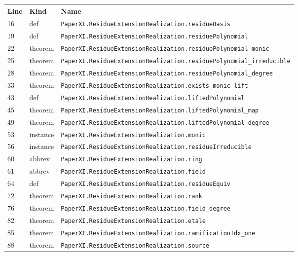 \documentclass[10pt,oneside]{book}
\begin{document}
\begin{longtable}{@{}p{}p{}p{}@{}}\toprule Line&Kind&Name\\\midrule\endhead

16&def&\nolinkurl{PaperXI.ResidueExtensionRealization.residueBasis}\\

19&def&\nolinkurl{PaperXI.ResidueExtensionRealization.residuePolynomial}\\

22&theorem&\nolinkurl{PaperXI.ResidueExtensionRealization.residuePolynomial_monic}\\

25&theorem&\nolinkurl{PaperXI.ResidueExtensionRealization.residuePolynomial_irreducible}\\

28&theorem&\nolinkurl{PaperXI.ResidueExtensionRealization.residuePolynomial_degree}\\

33&theorem&\nolinkurl{PaperXI.ResidueExtensionRealization.exists_monic_lift}\\

43&def&\nolinkurl{PaperXI.ResidueExtensionRealization.liftedPolynomial}\\

45&theorem&\nolinkurl{PaperXI.ResidueExtensionRealization.liftedPolynomial_map}\\

49&theorem&\nolinkurl{PaperXI.ResidueExtensionRealization.liftedPolynomial_degree}\\

53&instance&\nolinkurl{PaperXI.ResidueExtensionRealization.monic}\\

56&instance&\nolinkurl{PaperXI.ResidueExtensionRealization.residueIrreducible}\\

60&abbrev&\nolinkurl{PaperXI.ResidueExtensionRealization.ring}\\

61&abbrev&\nolinkurl{PaperXI.ResidueExtensionRealization.field}\\

64&def&\nolinkurl{PaperXI.ResidueExtensionRealization.residueEquiv}\\

72&theorem&\nolinkurl{PaperXI.ResidueExtensionRealization.rank}\\

76&theorem&\nolinkurl{PaperXI.ResidueExtensionRealization.field_degree}\\

82&theorem&\nolinkurl{PaperXI.ResidueExtensionRealization.etale}\\

85&theorem&\nolinkurl{PaperXI.ResidueExtensionRealization.ramificationIdx_one}\\

88&theorem&\nolinkurl{PaperXI.ResidueExtensionRealization.source}\\

\bottomrule\end{longtable}
\end{document}
